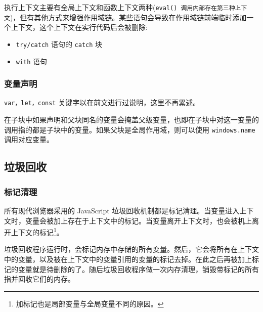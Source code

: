 执行上下文主要有全局上下文和函数上下文两种(\texttt{eval() 调用内部存在第三种上下文})，但有其他方式来增强作用域链。某些语句会导致在作用域链前端临时添加一个上下文，这个上下文在实行代码后会被删除:
\begin{itemize}
    \item \texttt{try/catch} 语句的 \texttt{catch} 块
    \item \texttt{with} 语句
\end{itemize}

\subsubsection{变量声明}

\texttt{var，let，const} 关键字以在前文进行过说明，这里不再累述。

在子块中如果声明和父块同名的变量会掩盖父级变量，也即在子块中对这一变量的调用指的都是子块中的变量。如果父块是全局作用域，则可以使用 \texttt{windows.name} 调用对应变量。


\subsection{垃圾回收}
\subsubsection{标记清理}

所有现代浏览器采用的 JavaScript 垃圾回收机制都是标记清理。当变量进入上下文时，变量会被加上存在于上下文中的标记。当变量离开上下文时，也会被机上离开上下文的标记\footnote{加标记也是局部变量与全局变量不同的原因。}。

垃圾回收程序运行时，会标记内存中存储的所有变量。然后，它会将所有在上下文中的变量，以及被在上下文中的变量引用的变量的标记去掉。在此之后再被加上标记的变量就是待删除的了。随后垃圾回收程序做一次内存清理，销毁带标记的所有指并回收它们的内存。



